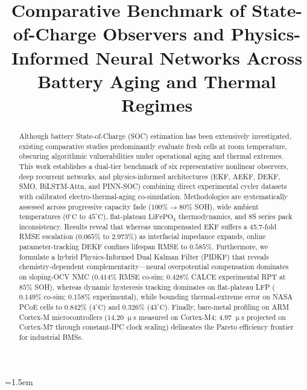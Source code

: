 \documentclass[balance,nocopyright,upint,varvw,hyphenate,barcolor=NavyBlue,nolists]{asmejour}
\begin{document}
\emergencystretch=1.5em



\title{Comparative Benchmark of State-of-Charge Observers and Physics-Informed Neural Networks Across Battery Aging and Thermal Regimes}


\begin{abstract}
Although battery State-of-Charge (SOC) estimation has been extensively investigated, existing comparative studies predominantly evaluate fresh cells at room temperature, obscuring algorithmic vulnerabilities under operational aging and thermal extremes. This work establishes a dual-tier benchmark of six representative nonlinear observers, deep recurrent networks, and physics-informed architectures (EKF, AEKF, DEKF, SMO, BiLSTM-Attn, and PINN-SOC) combining direct experimental cycler datasets with calibrated electro-thermal-aging co-simulation. Methodologies are systematically assessed across progressive capacity fade ($100\% \rightarrow 80\%$ SOH), wide ambient temperatures ($0^\circ\text{C}$ to $45^\circ\text{C}$), flat-plateau $\text{LiFePO}_4$ thermodynamics, and 8S series pack inconsistency. Results reveal that whereas uncompensated EKF suffers a 45.7-fold RMSE escalation ($0.065\%$ to $2.973\%$) as interfacial impedance expands, online parameter-tracking DEKF confines lifespan RMSE to $0.585\%$. Furthermore, we formulate a hybrid Physics-Informed Dual Kalman Filter (PIDKF) that reveals chemistry-dependent complementarity—neural overpotential compensation dominates on sloping-OCV NMC ($0.414\%$ RMSE co-sim; $0.428\%$ CALCE experimental RPT at $85\%$ SOH), whereas dynamic hysteresis tracking dominates on flat-plateau LFP ($0.149\%$ co-sim; $0.158\%$ experimental), while bounding thermal-extreme error on NASA PCoE cells to $0.842\%$ ($4^\circ\text{C}$) and $0.326\%$ ($43^\circ\text{C}$). Finally, bare-metal profiling on ARM Cortex-M microcontrollers ($14.20\;\upmu\mathrm{s}$ measured on Cortex-M4; $4.97\;\upmu\mathrm{s}$ projected on Cortex-M7 through constant-IPC clock scaling) delineates the Pareto efficiency frontier for industrial BMSs.
\end{abstract}
\end{document}
